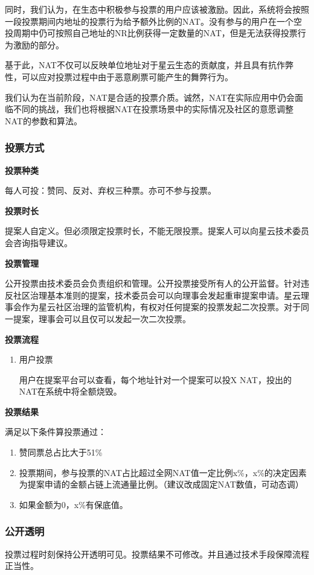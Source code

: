 同时，我们认为，在生态中积极参与投票的用户应该被激励。因此，系统将会按照一段投票期间内地址的投票行为给予额外比例的NAT。没有参与的用户在一个空投周期中仍可按照自己地址的NR比例获得一定数量的NAT，但是无法获得投票行为激励的部分。

基于此，NAT不仅可以反映单位地址对于星云生态的贡献度，并且具有抗作弊性，可以应对投票过程中由于恶意刷票可能产生的舞弊行为。

我们认为在当前阶段，NAT是合适的投票介质。诚然，NAT在实际应用中仍会面临不同的挑战，我们也将根据NAT在投票场景中的实际情况及社区的意愿调整NAT的参数和算法。

\subsubsection{投票方式}
\textbf{投票种类}

每人可投：赞同、反对、弃权三种票。亦可不参与投票。

\textbf{投票时长}

提案人自定义。但必须限定投票时长，不能无限投票。提案人可以向星云技术委员会咨询指导建议。

\textbf{投票管理}

公开投票由技术委员会负责组织和管理。公开投票接受所有人的公开监督。针对违反社区治理基本准则的提案，技术委员会可以向理事会发起重审提案申请。星云理事会作为星云社区治理的监管机构，有权对任何提案的投票发起二次投票。对于同一提案，理事会可以且仅可以发起一次二次投票。

\textbf{投票流程}
\begin{enumerate}

\item 用户投票

用户在提案平台可以查看，每个地址针对一个提案可以投X NAT，投出的NAT在系统中将全额烧毁。

\end{enumerate}

\textbf{投票结果}

满足以下条件算投票通过：

\begin{enumerate}
\item 赞同票总占比大于51\%
\item 投票期间，参与投票的NAT占比超过全网NAT值一定比例x\%，x\%的决定因素为提案申请的金额占链上流通量比例。{\color{red}（建议改成固定NAT数值，可动态调）}
\item 如果金额为0，x\%有保底值。
\end{enumerate}

\subsubsection{公开透明}
投票过程时刻保持公开透明可见。投票结果不可修改。并且通过技术手段保障流程正当性。

